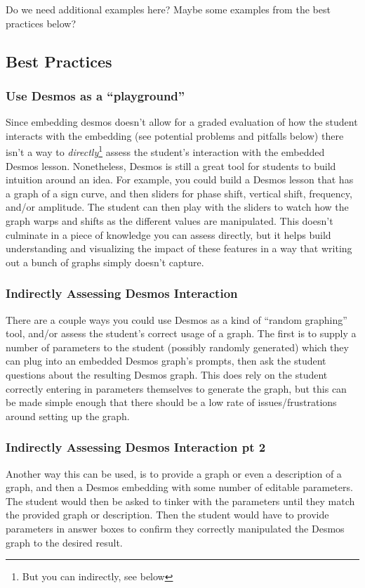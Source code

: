 \documentclass{ximera}
\begin{document}
        Do we need additional examples here? Maybe some examples from the best practices below?
        
    \subsection*{Best Practices}
    
        \subsubsection*{Use Desmos as a ``playground''}
            Since embedding desmos doesn't allow for a graded evaluation of how the student interacts with the embedding (see potential problems and pitfalls below) there isn't a way to \textit{directly}\footnote{But you can indirectly, see below} assess the student's interaction with the embedded Desmos lesson. Nonetheless, Desmos is still a great tool for students to build intuition around an idea. For example, you could build a Desmos lesson that has a graph of a sign curve, and then sliders for phase shift, vertical shift, frequency, and/or amplitude. The student can then play with the sliders to watch how the graph warps and shifts as the different values are manipulated. This doesn't culminate in a piece of knowledge you can assess directly, but it helps build understanding and visualizing the impact of these features in a way that writing out a bunch of graphs simply doesn't capture.
        
        \subsubsection*{Indirectly Assessing Desmos Interaction}
            There are a couple ways you could use Desmos as a kind of ``random graphing'' tool, and/or assess the student's correct usage of a graph. The first is to supply a number of parameters to the student (possibly randomly generated) which they can plug into an embedded Desmos graph's prompts, then ask the student questions about the resulting Desmos graph. This does rely on the student correctly entering in parameters themselves to generate the graph, but this can be made simple enough that there should be a low rate of issues/frustrations around setting up the graph.
            
        \subsubsection*{Indirectly Assessing Desmos Interaction pt 2}
            Another way this can be used, is to provide a graph or even a description of a graph, and then a Desmos embedding with some number of editable parameters. The student would then be asked to tinker with the parameters until they match the provided graph or description. Then the student would have to provide parameters in answer boxes to confirm they correctly manipulated the Desmos graph to the desired result. 
    
\end{document}
